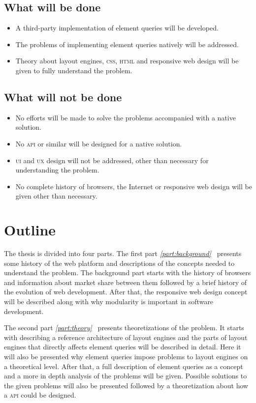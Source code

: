 \documentclass[a4paper,11pt]{kth-mag}
\begin{document}
      \subsection{What will be done}
      \begin{itemize}
      \item A third-party implementation of element queries will be developed.
      \item The problems of implementing element queries natively will be addressed.
      \item Theory about layout engines, \textsc{css}, \textsc{html} and responsive web design will be given to fully understand the problem.
      \end{itemize}

      \subsection{What will not be done}
      \begin{itemize}
      \item No efforts will be made to solve the problems accompanied with a native solution.
      \item No \textsc{api} or similar will be designed for a native solution.
      \item \textsc{ui} and \textsc{ux} design will not be addressed, other than necessary for understanding the problem.
      \item No complete history of browsers, the Internet or responsive web design will be given other than necessary.
      \end{itemize}
    \section{Outline}
      The thesis is divided into four parts. The first part \emph{\ref{part:background}~} presents some history of the web platform and descriptions of the concepts needed to understand the problem.
      The background part starts with the history of browsers and information about market share between them followed by a brief history of the evolution of web development.
      After that, the responsive web design concept will be described along with why modularity is important in software development.

      The second part \emph{\ref{part:theory}~} presents theoretizations of the problem.
      It starts with describing a reference architecture of layout engines and the parts of layout engines that directly affects element queries will be described in detail.
      Here it will also be presented why element queries impose problems to layout engines on a theoretical level.
      After that, a full description of element queries as a concept and a more in depth analysis of the problems will be given.
      Possible solutions to the given problems will also be presented followed by a theoretization about how a \textsc{api} could be designed.
\end{document}
